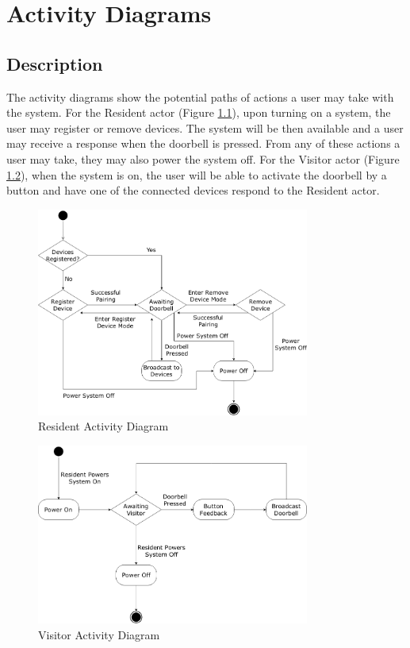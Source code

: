 \chapter{Activity Diagrams}

\section{Description}
The activity diagrams show the potential paths of actions a user may take with the system. For the Resident actor (Figure \ref{fig:residentdiagram}), upon turning on a system, the user may register or remove devices. The system will be then available and a user may receive a response when the doorbell is pressed. From any of these actions a user may take, they may also power the system off. For the Visitor actor (Figure \ref{fig:visitordiagram}), when the system is on, the user will be able to activate the doorbell by a button and have one of the connected devices respond to the Resident actor.

\begin{figure}[ht]
  \includegraphics[width=0.8\textwidth]{ResidentActivityDiagram.png}
  \centering
  \caption{Resident Activity Diagram}
  \label{fig:residentdiagram}
\end{figure}

\begin{figure}[ht]
  \includegraphics[width=0.8\textwidth]{VisitorActivityDiagram.png}
  \centering
  \caption{Visitor Activity Diagram}
  \label{fig:visitordiagram}
\end{figure}